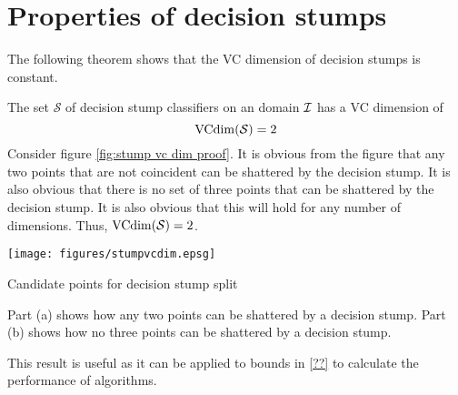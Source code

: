 \section{Properties of decision stumps}

The following theorem shows that the VC dimension of decision stumps
is constant.

\begin{theorem}
\label{theorem:vcdim stumps}
The set $\mathcal{S}$ of decision stump classifiers on an domain
$\mathcal{I}$ has a VC dimension of
%
\begin{equation}
\mathrm{VCdim}(\mathcal{S}) = 2
\end{equation}
%
\proof Consider figure \ref{fig:stump vc dim proof}.  It is obvious
from the figure that any two points that are not coincident can be
shattered by the decision stump.  It is also obvious that there is no
set of three points that can be shattered by the decision stump.  It
is also obvious that this will hold for any number of dimensions.
Thus, $\mathrm{VCdim}(\mathcal{S}) = 2$.
\end{theorem}

\begin{linefigure}
\begin{center}
\texttt{[image: figures/stumpvcdim.epsg]}
\end{center}
\caption{Candidate points for decision stump split}
Part (a) shows how any two points can be shattered by a decision
stump.  Part (b) shows how no three points can be shattered by a
decision stump.
\label{fig:stumps vc dim proof}
\end{linefigure}

This result is useful as it can be applied to bounds in \ref{??} to
calculate the performance of algorithms.




